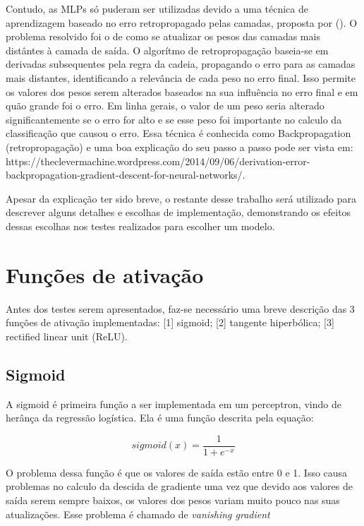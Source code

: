 \documentclass[conference]{IEEEtran}
\begin{document}
  Contudo, as MLPs só puderam ser utilizadas devido a uma técnica de aprendizagem baseado no erro retropropagado pelas camadas, proposta por \citeauthor{rumelhart1986learning} (\citeyear{rumelhart1986learning}). O problema resolvido foi o de como se atualizar os pesos das camadas mais distântes à camada de saída. O algorítmo de retropropagação baseia-se em derivadas subsequentes pela regra da cadeia, propagando o erro para as camadas mais distantes, identificando a relevância de cada peso no erro final. Isso permite os valores dos pesos serem alterados baseados na sua influência no erro final e em quão grande foi o erro. Em linha gerais, o valor de um peso seria alterado significantemente se o erro for alto e se esse peso foi importante no calculo da classificação que causou o erro. Essa técnica é conhecida como Backpropagation (retropropagação) e uma boa explicação do seu passo a passo pode ser vista em: https://theclevermachine.wordpress.com/2014/09/06/derivation-error-backpropagation-gradient-descent-for-neural-networks/.
  
  Apesar da explicação ter sido breve, o restante desse trabalho será utilizado para descrever alguns detalhes e escolhas de implementação, demonstrando os efeitos dessas escolhas nos testes realizados para escolher um modelo.
  
\section{Funções de ativação}
	Antes dos testes serem apresentados, faz-se necessário uma breve descrição das 3 funções de ativação implementadas: [1] sigmoid; [2] tangente hiperbólica; [3] rectified linear unit (ReLU).
	
\subsection{Sigmoid}

	A sigmoid é primeira função a ser implementada em um perceptron, vindo de herânça da regressão logística. Ela é uma função descrita pela equação: 

\begin{equation}
sigmoid(x) = \dfrac{1}{1 + e^{-x}}
\end{equation}	

	O problema dessa função é que os valores de saída estão entre 0 e 1. Isso causa problemas no calculo da descida de gradiente uma vez que devido aos valores de saída serem sempre baixos, os valores dos pesos variam muito pouco nas suas atualizações. Esse problema é chamado de \textit{vanishing gradient}
	
\end{document}
